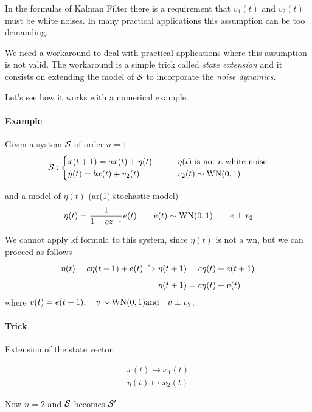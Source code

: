 \begin{remark}
    In the formulas of Kalman Filter there is a requirement that $v_1(t)$ and $v_2(t)$ must be white noises.
    In many practical applications this assumption can be too demanding.

    We need a workaround to deal with practical applications where this assumption is not valid.
    The workaround is a simple trick called \emph{state extension} and it consists on extending the model of $\mathcal{S}$ to incorporate the \emph{noise dynamics}.

    Let's see how it works with a numerical example.

    \paragraph{Example}

    Given a system $\mathcal{S}$ of order $n=1$
    \[
        \mathcal{S}:
        \begin{cases}
            x(t+1) = ax(t) + \eta(t) \qquad & \eta(t) \text{ is not a white noise}\\
            y(t) = bx(t) + v_2(t) \qquad & v_2(t) \sim \operatorname{WN}(0,1)
        \end{cases}
    \]

    and a model of $\eta(t)$ (\acrshort{ar}(1) stochastic model)
    \[
        \eta(t) = \frac{1}{1-cz^{-1}}e(t) \qquad e(t) \sim \operatorname{WN}(0,1) \qquad e \perp v_2
    \]
   
    We cannot apply \gls{kf} formula to this system, since $\eta(t)$ is not a \gls{wn}, but we can proceed as follows
    \begin{align*}
        \eta(t) = c\eta(t-1) + e(t) \xRightarrow{z} \eta(t+1) &= c\eta(t) + e(t+1) \\
        \eta(t+1) &= c\eta(t) + v(t)
    \end{align*}
    where $v(t) = e(t+1), \quad v \sim \operatorname{WN}(0,1) \text{and} \quad v \perp v_2$.

    \paragraph{Trick} Extension of the state vector.

    \begin{align*}
        x(t) \mapsto x_1(t) \\
        \eta(t) \mapsto x_2(t)
    \end{align*}

    Now $n=2$ and $\mathcal{S}$ becomes $\mathcal{S}'$


\end{remark}
